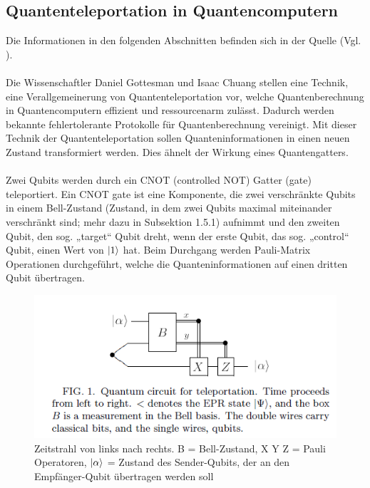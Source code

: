 \subsection{Quantenteleportation in Quantencomputern}
Die Informationen in den folgenden Abschnitten befinden sich in der Quelle (Vgl. \cite[S.1-2]{gottesman_quantum_1999}).\\
\\
Die Wissenschaftler Daniel Gottesman und Isaac Chuang stellen eine Technik, eine Verallgemeinerung von Quantenteleportation vor, welche Quantenberechnung in Quantencomputern effizient und ressourcenarm zulässt. Dadurch werden bekannte fehlertolerante Protokolle für Quantenberechnung vereinigt. Mit dieser Technik der Quantenteleportation sollen Quanteninformationen in einen neuen Zustand transformiert werden. Dies ähnelt der Wirkung eines Quantengatters.\\
\\
Zwei Qubits werden durch ein CNOT (controlled NOT) Gatter (gate) teleportiert. Ein CNOT gate ist eine Komponente, die zwei verschränkte Qubits in einem Bell-Zustand (Zustand, in dem zwei Qubits maximal miteinander verschränkt sind; mehr dazu in Subsektion 1.5.1) aufnimmt und den zweiten Qubit, den sog. „target“ Qubit dreht, wenn der erste Qubit, das sog. „control“ Qubit, einen Wert von \(\ket{1}\) hat. Beim Durchgang werden Pauli-Matrix Operationen durchgeführt, welche die Quanteninformationen auf einen dritten Qubit übertragen.\\
\begin{figure}[h!]
    \centering
    \includegraphics[width=1.0\textwidth]{images/quantum-information/quantenteleportation_cnot_1.png}
    \caption{Zeitstrahl von links nach rechts. B = Bell-Zustand, X Y Z = Pauli Operatoren, \(\ket{\alpha}\) = Zustand des Sender-Qubits, der an den Empfänger-Qubit übertragen werden soll}
    \label{fig:meinbild}
\end{figure}
